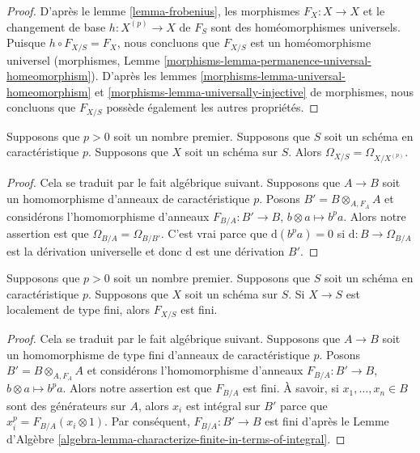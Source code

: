 \begin{proof}
D'après le lemme \ref{lemma-frobenius}, les morphismes $F_X : X
\to X$ et le changement de base $h : X^{(p)} \to X$ de $F_S$ sont
des homéomorphismes universels. Puisque $h \circ F_{X/S} = F_X$,
nous concluons que $F_{X/S}$ est un homéomorphisme universel
(morphismes, Lemme
\ref{morphisms-lemma-permanence-universal-homeomorphism}). D'après les lemmes
\ref{morphisms-lemma-universal-homeomorphism} et
\ref{morphisms-lemma-universally-injective} de morphismes, nous concluons que $F_{X/S}$ possède également les autres propriétés.
\end{proof}

\begin{lemma}
\label{lemma-relative-frobenius-omega}
Supposons que $p > 0$ soit un nombre premier. Supposons que $S$ soit un schéma en
caractéristique $p$. Supposons que $X$ soit un schéma sur $S$. Alors $\Omega_{X/S} = \Omega_{X/X^{(p)}}$.
\end{lemma}

\begin{proof}
Cela se traduit par le fait algébrique suivant. Supposons
que $A \to B$ soit un homomorphisme d'anneaux de
caractéristique $p$. Posons $B' = B \otimes_{A, F_A} A$ et
considérons l'homomorphisme d'anneaux $F_{B/A} : B' \to B$,
$b \otimes a \mapsto b^pa$. Alors notre assertion est que
$\Omega_{B/A} = \Omega_{B/B'}$. C'est vrai parce que
$\text{d}(b^pa) = 0$ si $\text{d} : B \to \Omega_{B/A}$ est la
dérivation universelle et donc $\text{d}$ est une dérivation $B'$.
\end{proof}

\begin{lemma}
\label{lemma-relative-frobenius-finite}
Supposons que $p > 0$ soit un nombre premier. Supposons que $S$ soit un
schéma en caractéristique $p$. Supposons que $X$ soit un schéma sur
$S$. Si $X \to S$ est localement de type fini, alors $F_{X/S}$ est fini.
\end{lemma}

\begin{proof}
Cela se traduit par le fait algébrique suivant. Supposons que $A
\to B$ soit un homomorphisme de type fini d'anneaux de
caractéristique $p$. Posons $B' = B \otimes_{A, F_A} A$ et
considérons l'homomorphisme d'anneaux $F_{B/A} : B' \to B$, $b
\otimes a \mapsto b^pa$. Alors notre assertion est que $F_{B/A}$ est
fini. À savoir, si $x_1, \ldots, x_n \in B$ sont des générateurs sur
$A$, alors $x_i$ est intégral sur $B'$ parce que $x_i^p = F_{B/A}(x_i
\otimes 1)$. Par conséquent, $F_{B/A} : B' \to B$ est fini d'après le
Lemme d'Algèbre \ref{algebra-lemma-characterize-finite-in-terms-of-integral}.
\end{proof}

